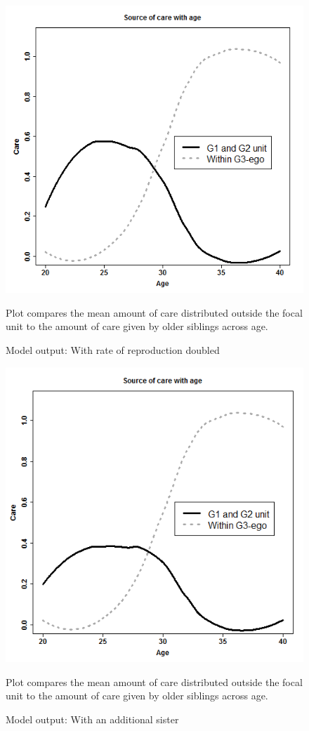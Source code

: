 \documentclass[10pt]{article}
\begin{document}
\begin{figure}[h]
\caption{Model output: With rate of reproduction doubled} \label{fig:supp31} 
    \centering
    \includegraphics[scale=0.65]{repro_50per}

{Plot compares the mean amount of care distributed outside the focal unit to the amount of care given by older siblings across age.}
\end{figure}

\begin{figure}[h]
\caption{Model output: With an additional sister} \label{fig:supp32} 
    \centering
    \includegraphics[scale=0.65]{third_sister}

{Plot compares the mean amount of care distributed outside the focal unit to the amount of care given by older siblings across age.}
\end{figure}
\end{document}
